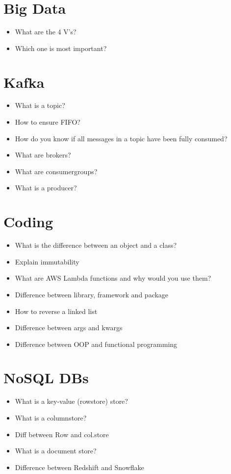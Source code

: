 \documentclass[12pt, numbers=noenddot]{scrreprt} %
\begin{document}
\section*{Big Data}

\begin{itemize}
\item What are the 4 V's?
\item Which one is most important?
\end{itemize}

\section*{Kafka}

\begin{itemize}
\item What is a topic?
\item How to ensure FIFO?
\item How do you know if all messages in a topic have been fully consumed?
\item What are brokers?
\item What are consumergroups?
\item What is a producer?
\end{itemize}

\section*{Coding}

\begin{itemize}
\item What is the difference between an object and a class?
\item Explain immutability
\item What are AWS Lambda functions and why would you use them?
\item Difference between library, framework and package
\item How to reverse a linked list
\item Difference between args and kwargs
\item Difference between OOP and functional programming
\end{itemize}

\section*{NoSQL DBs}

\begin{itemize}
\item What is a key-value (rowstore) store?
\item What is a columnstore?
\item Diff between Row and col.store
\item What is a document store?
\item Difference between Redshift and Snowflake
\end{itemize}
\end{document}
